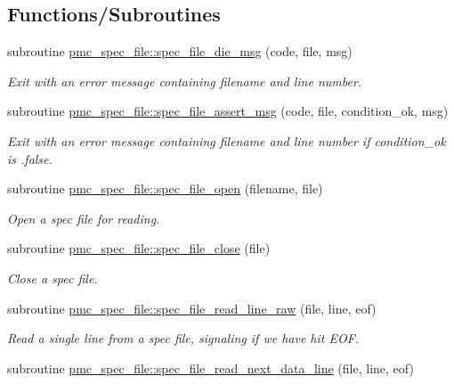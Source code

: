 \subsection*{Functions/\+Subroutines}
\begin{DoxyCompactItemize}
\item 
subroutine \mbox{\hyperlink{namespacepmc__spec__file_ac24abec0f3c3e539debe886ddc775e1e}{pmc\+\_\+spec\+\_\+file\+::spec\+\_\+file\+\_\+die\+\_\+msg}} (code, file, msg)
\begin{DoxyCompactList}\small\item\em Exit with an error message containing filename and line number. \end{DoxyCompactList}\item 
subroutine \mbox{\hyperlink{namespacepmc__spec__file_a5aa135a96d6a58a77a3b662942666146}{pmc\+\_\+spec\+\_\+file\+::spec\+\_\+file\+\_\+assert\+\_\+msg}} (code, file, condition\+\_\+ok, msg)
\begin{DoxyCompactList}\small\item\em Exit with an error message containing filename and line number if {\ttfamily condition\+\_\+ok} is {\ttfamily }.false. \end{DoxyCompactList}\item 
subroutine \mbox{\hyperlink{namespacepmc__spec__file_a43c0fc75a0548567dae0812159a0288e}{pmc\+\_\+spec\+\_\+file\+::spec\+\_\+file\+\_\+open}} (filename, file)
\begin{DoxyCompactList}\small\item\em Open a spec file for reading. \end{DoxyCompactList}\item 
subroutine \mbox{\hyperlink{namespacepmc__spec__file_a430ebeed3523661d0f5bc18d682c1cc5}{pmc\+\_\+spec\+\_\+file\+::spec\+\_\+file\+\_\+close}} (file)
\begin{DoxyCompactList}\small\item\em Close a spec file. \end{DoxyCompactList}\item 
subroutine \mbox{\hyperlink{namespacepmc__spec__file_a1225f44ce38aaf0343dd74cf7435770a}{pmc\+\_\+spec\+\_\+file\+::spec\+\_\+file\+\_\+read\+\_\+line\+\_\+raw}} (file, line, eof)
\begin{DoxyCompactList}\small\item\em Read a single line from a spec file, signaling if we have hit E\+OF. \end{DoxyCompactList}\item 
subroutine \mbox{\hyperlink{namespacepmc__spec__file_a01c2274e2a58d5b7a83d3997d36742d6}{pmc\+\_\+spec\+\_\+file\+::spec\+\_\+file\+\_\+read\+\_\+next\+\_\+data\+\_\+line}} (file, line, eof)

\end{DoxyCompactItemize}
